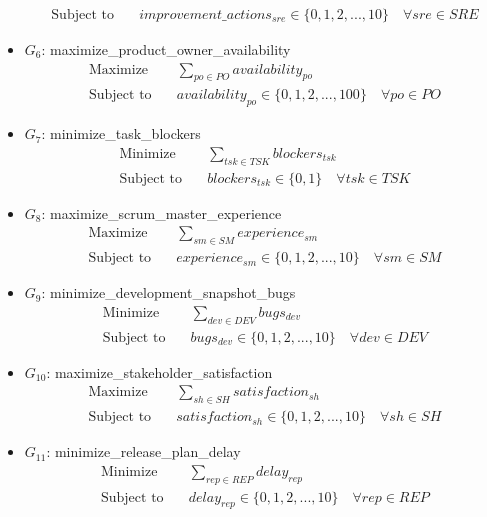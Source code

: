 \documentclass{article}
\begin{document}
\begin{itemize}
\begin{align*}
            \text{Subject to} \quad &improvement\_actions_{sre} \in \{0, 1, 2, ..., 10\} \quad \forall sre \in SRE
        \end{align*}
    \item $G_6$: maximize\_product\_owner\_availability
        \begin{align*}
            \text{Maximize} \quad &\sum_{po \in PO} availability_{po} \\
            \text{Subject to} \quad &availability_{po} \in \{0, 1, 2, ..., 100\} \quad \forall po \in PO
        \end{align*}
    \item $G_7$: minimize\_task\_blockers
        \begin{align*}
            \text{Minimize} \quad &\sum_{tsk \in TSK} blockers_{tsk} \\
            \text{Subject to} \quad &blockers_{tsk} \in \{0, 1\} \quad \forall tsk \in TSK
        \end{align*}
    \item $G_8$: maximize\_scrum\_master\_experience
        \begin{align*}
            \text{Maximize} \quad &\sum_{sm \in SM} experience_{sm} \\
            \text{Subject to} \quad &experience_{sm} \in \{0, 1, 2, ..., 10\} \quad \forall sm \in SM
        \end{align*}
    \item $G_9$: minimize\_development\_snapshot\_bugs
        \begin{align*}
            \text{Minimize} \quad &\sum_{dev \in DEV} bugs_{dev} \\
            \text{Subject to} \quad &bugs_{dev} \in \{0, 1, 2, ..., 10\} \quad \forall dev \in DEV
        \end{align*}
    \item $G_{10}$: maximize\_stakeholder\_satisfaction
        \begin{align*}
            \text{Maximize} \quad &\sum_{sh \in SH} satisfaction_{sh} \\
            \text{Subject to} \quad &satisfaction_{sh} \in \{0, 1, 2, ..., 10\} \quad \forall sh \in SH
        \end{align*}
    \item $G_{11}$: minimize\_release\_plan\_delay
        \begin{align*}
            \text{Minimize} \quad &\sum_{rep \in REP} delay_{rep} \\
            \text{Subject to} \quad &delay_{rep} \in \{0, 1, 2, ..., 10\} \quad \forall rep \in REP

\end{align*}
\end{itemize}
\end{document}
